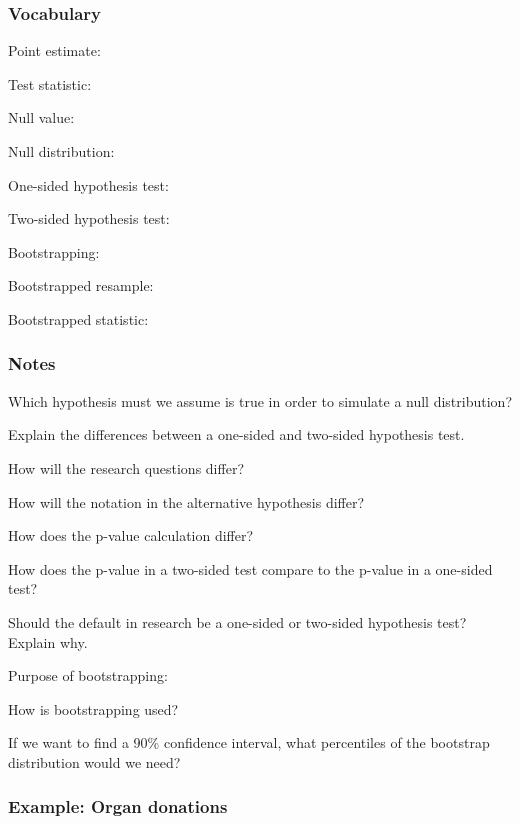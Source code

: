 \documentclass[
]{report}
\newcommand{\rgs}{\vspace{12pt}} %
\newcommand{\rgi}{\hspace{24pt}}  %
\begin{document}
\hypertarget{vocabulary-10}{%
\subsubsection*{Vocabulary}\label{vocabulary-10}}

Point estimate:
\rgs

Test statistic:
\rgs

Null value:
\rgs

Null distribution:
\rgs

One-sided hypothesis test:
\rgs

Two-sided hypothesis test:
\rgs

Bootstrapping:
\rgs

Bootstrapped resample:
\rgs

Bootstrapped statistic:
\rgs

\hypertarget{notes-14}{%
\subsubsection*{Notes}\label{notes-14}}

Which hypothesis must we assume is true in order to simulate a null distribution?
\rgs

Explain the differences between a one-sided and two-sided hypothesis test.
\vspace{1mm}

\rgi How will the research questions differ?
\rgs

\rgi How will the notation in the alternative hypothesis differ?
\rgs

\rgi How does the p-value calculation differ?
\rgs

How does the p-value in a two-sided test compare to the p-value in a one-sided test?
\rgs

Should the default in research be a one-sided or two-sided hypothesis test? Explain why.
\rgs
\rgs

Purpose of bootstrapping:
\rgs

How is bootstrapping used?\\
\rgs

If we want to find a 90\% confidence interval, what percentiles of the bootstrap distribution would we need?\\
\rgs

\hypertarget{example-organ-donations}{%
\subsubsection*{Example: Organ donations}\label{example-organ-donations}}
\end{document}
